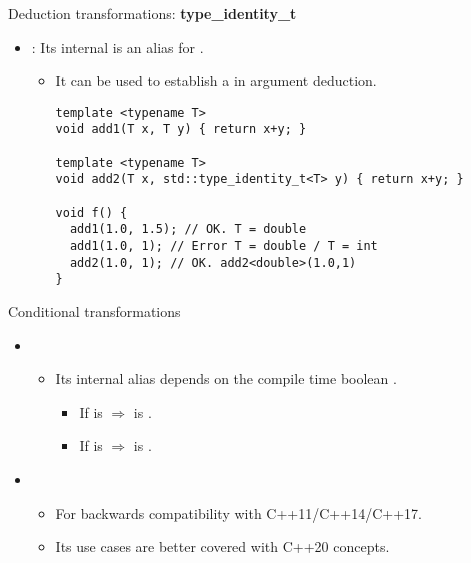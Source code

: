\begin{frame}[t,fragile]{Deduction transformations: \textbf{type\_identity\_t}}
\begin{itemize}
  \item {}: Its internal  is an alias for .
    \begin{itemize}
      \item It can be used to establish a  in argument deduction.
\begin{lstlisting}
template <typename T>
void add1(T x, T y) { return x+y; }

template <typename T>
void add2(T x, std::type_identity_t<T> y) { return x+y; }

void f() {
  add1(1.0, 1.5); // OK. T = double
  add1(1.0, 1); // Error T = double / T = int
  add2(1.0, 1); // OK. add2<double>(1.0,1)
}
\end{lstlisting}
    \end{itemize}
\end{itemize}
\end{frame}

\begin{frame}[t,fragile]{Conditional transformations}
\begin{itemize}
  \item {}
    \begin{itemize}
      \item Its internal alias  depends on the compile time
            boolean .
        \begin{itemize}
          \item If  is  $\Rightarrow$ 
                 is .
          \item If  is  $\Rightarrow$ 
                 is .
        \end{itemize}

    \end{itemize}

  \item {}
    \begin{itemize}
      \item For backwards compatibility with C++11/C++14/C++17.
      \item Its use cases are better covered with C++20 concepts.
    \end{itemize}
\end{itemize}
\end{frame}
